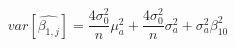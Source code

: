 \begin{equation}
var[\hat{\beta_{1,j}}] = \frac{4\sigma_0^2}{n}\mu_{a}^2 + \frac{4\sigma_0^2}{n}\sigma_{a}^2 + \sigma_{a}^2\beta_{10}^2
\end{equation}